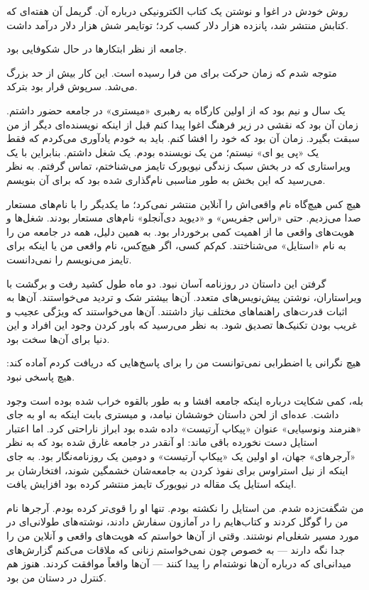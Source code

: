 روش خودش در اغوا و نوشتن یک کتاب الکترونیکی درباره آن. گریمل آن هفته‌ای که کتابش منتشر شد، پانزده هزار دلار کسب کرد؛ توتایمر شش هزار دلار درآمد داشت.

جامعه از نظر ابتکارها در حال شکوفایی بود.

متوجه شدم که زمان حرکت برای من فرا رسیده است. این کار بیش از حد بزرگ می‌شد. سرپوش قرار بود بترکد.

یک سال و نیم بود که از اولین کارگاه به رهبری «میستری» در جامعه حضور داشتم. زمان آن بود که نقشی در زیر فرهنگ اغوا پیدا کنم قبل از اینکه نویسنده‌ای دیگر از من سبقت بگیرد. زمان آن بود که خود را افشا کنم. باید به خودم یادآوری می‌کردم که فقط یک «پی یو ای» نیستم؛ من یک نویسنده بودم. یک شغل داشتم. بنابراین با یک ویراستاری که در بخش سبک زندگی نیویورک تایمز می‌شناختم، تماس گرفتم. به نظر می‌رسید که این بخش به طور مناسبی نام‌گذاری شده بود که برای آن بنویسم.

هیچ کس هیچ‌گاه نام واقعی‌اش را آنلاین منتشر نمی‌کرد؛ ما یکدیگر را با نام‌های مستعار صدا می‌زدیم. حتی «راس جفریس» و «دیوید دی‌آنجلو» نام‌های مستعار بودند. شغل‌ها و هویت‌های واقعی ما از اهمیت کمی برخوردار بود. به همین دلیل، همه در جامعه من را به نام «استایل» می‌شناختند. کم‌کم کسی، اگر هیچ‌کس، نام واقعی من یا اینکه برای تایمز می‌نویسم را نمی‌دانست.

گرفتن این داستان در روزنامه آسان نبود. دو ماه طول کشید رفت و برگشت با ویراستاران، نوشتن پیش‌نویس‌های متعدد. آن‌ها بیشتر شک و تردید می‌خواستند. آن‌ها به اثبات قدرت‌های راهنماهای مختلف نیاز داشتند. آن‌ها می‌خواستند که ویژگی عجیب و غریب بودن تکنیک‌ها تصدیق شود. به نظر می‌رسید که باور کردن وجود این افراد و این دنیا برای آن‌ها سخت بود.

هیچ نگرانی یا اضطرابی نمی‌توانست من را برای پاسخ‌هایی که دریافت کردم آماده کند: هیچ پاسخی نبود.

بله، کمی شکایت درباره اینکه جامعه افشا و به طور بالقوه خراب شده بوده است وجود داشت. عده‌ای از لحن داستان خوششان نیامد، و میستری بابت اینکه به او به جای «هنرمند ونوسیایی» عنوان «پیکاپ آرتیست» داده شده بود ابراز ناراحتی کرد. اما اعتبار استایل دست نخورده باقی ماند: او آنقدر در جامعه غارق شده بود که به نظر «آرجرهای» جهان، او اولین یک «پیکاپ آرتیست» و دومین یک روزنامه‌نگار بود. به جای اینکه از نیل استراوس برای نفوذ کردن به جامعه‌شان خشمگین شوند، افتخارشان بر اینکه استایل یک مقاله در نیویورک تایمز منتشر کرده بود افزایش یافت.

من شگفت‌زده شدم. من استایل را نکشته بودم. تنها او را قوی‌تر کرده بودم. آرجرها نام من را گوگل کردند و کتاب‌هایم را در آمازون سفارش دادند، نوشته‌های طولانی‌ای در مورد مسیر شغلی‌ام نوشتند. وقتی از آن‌ها خواستم که هویت‌های واقعی و آنلاین من را جدا نگه دارند — به خصوص چون نمی‌خواستم زنانی که ملاقات می‌کنم گزارش‌های میدانی‌ای که درباره آن‌ها نوشته‌ام را پیدا کنند — آن‌ها واقعاً موافقت کردند. هنوز هم کنترل در دستان من بود.

